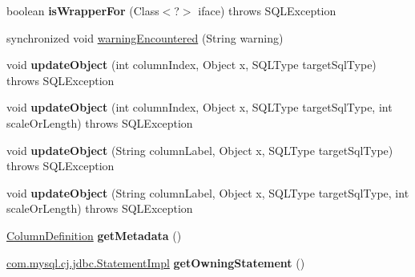\begin{DoxyCompactItemize}
boolean {\bfseries is\+Wrapper\+For} (Class$<$?$>$ iface)  throws S\+Q\+L\+Exception 
\item 
synchronized void \mbox{\hyperlink{classcom_1_1mysql_1_1cj_1_1jdbc_1_1result_1_1_result_set_impl_a5ec67812de95d09373cc9551d32f75eb}{warning\+Encountered}} (String warning)
\item 
\mbox{\label{classcom_1_1mysql_1_1cj_1_1jdbc_1_1result_1_1_result_set_impl_aa901ccb14669f4e53a77196c37ad1844}} 
void {\bfseries update\+Object} (int column\+Index, Object x, S\+Q\+L\+Type target\+Sql\+Type)  throws S\+Q\+L\+Exception 
\item 
\mbox{\label{classcom_1_1mysql_1_1cj_1_1jdbc_1_1result_1_1_result_set_impl_a4665dd7b89c44445ac0f83cd851b721a}} 
void {\bfseries update\+Object} (int column\+Index, Object x, S\+Q\+L\+Type target\+Sql\+Type, int scale\+Or\+Length)  throws S\+Q\+L\+Exception 
\item 
\mbox{\label{classcom_1_1mysql_1_1cj_1_1jdbc_1_1result_1_1_result_set_impl_ae7f59957c7db8eaeeb84b59646ffe7d1}} 
void {\bfseries update\+Object} (String column\+Label, Object x, S\+Q\+L\+Type target\+Sql\+Type)  throws S\+Q\+L\+Exception 
\item 
\mbox{\label{classcom_1_1mysql_1_1cj_1_1jdbc_1_1result_1_1_result_set_impl_a8851566d2498a8c67efc9ab43f1e3062}} 
void {\bfseries update\+Object} (String column\+Label, Object x, S\+Q\+L\+Type target\+Sql\+Type, int scale\+Or\+Length)  throws S\+Q\+L\+Exception 
\item 
\mbox{\label{classcom_1_1mysql_1_1cj_1_1jdbc_1_1result_1_1_result_set_impl_ab8039f083d7598f8a09a8c1850a8cb97}} 
\mbox{\hyperlink{interfacecom_1_1mysql_1_1cj_1_1protocol_1_1_column_definition}{Column\+Definition}} {\bfseries get\+Metadata} ()
\item 
\mbox{\label{classcom_1_1mysql_1_1cj_1_1jdbc_1_1result_1_1_result_set_impl_a92c4f04e5def008c6bb83e224652a4e8}} 
\mbox{\hyperlink{classcom_1_1mysql_1_1cj_1_1jdbc_1_1_statement_impl}{com.\+mysql.\+cj.\+jdbc.\+Statement\+Impl}} {\bfseries get\+Owning\+Statement} ()

\end{DoxyCompactItemize}

